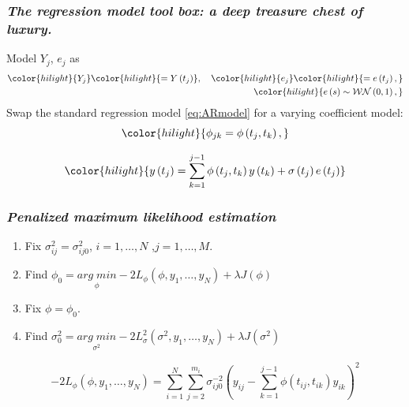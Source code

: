 \documentclass[12pt]{beamer}
\newcommand{\newmaththought}[1]{{ \color{hilight} {#1}}}
\newcommand\myfootnote[1]{%
  \begingroup
  \renewcommand\thefootnote{}\footnote{#1}%
  \addtocounter{footnote}{-1}%
  \endgroup
}
\begin{document}
\begin{frame}
\frametitle{\emph{The regression model tool box: a deep treasure chest of luxury.}}
Model $Y_j$, $e_j$ as
\begin{align*}
\begin{split}
\newmaththought{Y_j}  \newmaththought{= Y\left( t_j \right) },\quad \newmaththought{e_j}  \newmaththought{= e\left( t_j \right),}\\
\newmaththought{e\left(s\right) \sim  \mathcal{WN}\left(0,1\right),}
\end{split}
\end{align*}
\noindent
Swap the standard regression model \ref{eq:ARmodel} for a varying coefficient model:
\begin{equation*}
\newmaththought{\phi_{jk} = \phi\left(t_j,t_k\right),}
\end{equation*}

\begin{equation}   
\newmaththought{y\left(t_j \right)  = \sum_{k=1}^{j-1} \phi\left(t_j ,t_k\right) y\left(t_k\right) + \sigma\left(t_j\right)e\left({t_j}\right)}
\label{eq:MyModel} 
\end{equation}
\end{frame}



\begin{frame}
\frametitle{\emph{Penalized maximum likelihood estimation}}

\begin{enumerate}
\item Fix $\sigma_{ij}^2 = \sigma_{ij0}^2$, $i=1,\dots,N$ ,$j=1,\dots,M$.
\item Find $\phi_0 = \underset{\phi}{arg \; min} -2L_\phi\left(\phi, y_1,\dots, y_N \right) + \lambda J\left( \phi \right)$
\item Fix $\phi = \phi_{0}$.
\item Find  $\sigma_{0}^2 = \underset{\sigma^2}{arg\; min} -2L_\sigma^2\left(\sigma^2, y_1,\dots, y_N \right) + \lambda J\left( \sigma^2 \right)$
\end{enumerate}

\begin{adjustwidth}{-2cm}{-2cm}
\begin{equation}
-2 L_\phi\left(\phi, y_1, \dots,y_N \right) = \sum_{i=1}^N \sum_{j=2}^{m_i} \sigma_{ij0}^{-2} \left(y_{ij} - \sum_{k=1}^{j-1}\phi\left({t_{ij},t_{ik}}\right)y_{ik} \right)^2 \label{loglikelihood}
\end{equation}
\end{adjustwidth}
\end{frame}
\end{document}
